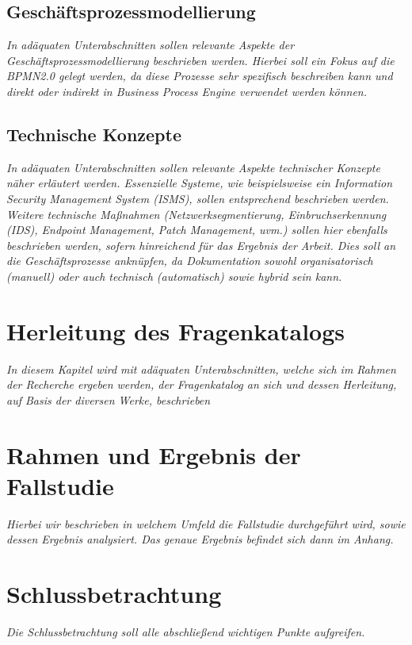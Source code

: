 \documentclass[11pt,a4paper,hidelinks]{article}   %
\begin{document}
        \subsection{Geschäftsprozessmodellierung}
            \emph{In adäquaten Unterabschnitten sollen relevante Aspekte der Geschäftsprozessmodellierung beschrieben werden. Hierbei soll ein Fokus auf die BPMN2.0 gelegt werden, da diese Prozesse sehr spezifisch beschreiben kann und direkt oder indirekt in Business Process Engine verwendet werden können.}
        \subsection{Technische Konzepte}
            \emph{In adäquaten Unterabschnitten sollen relevante Aspekte technischer Konzepte näher erläutert werden. Essenzielle Systeme, wie beispielsweise ein Information Security Management System (ISMS), sollen entsprechend beschrieben werden. Weitere technische Maßnahmen (Netzwerksegmentierung, Einbruchserkennung (IDS), Endpoint Management, Patch Management, uvm.) sollen hier ebenfalls beschrieben werden, sofern hinreichend für das Ergebnis der Arbeit. Dies soll an die Geschäftsprozesse anknüpfen, da Dokumentation sowohl organisatorisch (manuell) oder auch technisch (automatisch) sowie hybrid sein kann.}
    \section{Herleitung des Fragenkatalogs}\label{sec:HerleitungDesFragenkatalog}
        \emph{In diesem Kapitel wird mit adäquaten Unterabschnitten, welche sich im Rahmen der Recherche ergeben werden, der Fragenkatalog an sich und dessen Herleitung, auf Basis der diversen Werke, beschrieben}

    \newpage
    \section{Rahmen und Ergebnis der Fallstudie}
        \emph{Hierbei wir beschrieben in welchem Umfeld die Fallstudie durchgeführt wird, sowie dessen Ergebnis analysiert. Das genaue Ergebnis befindet sich dann im Anhang.}

    \newpage
    \section{Schlussbetrachtung}
        \emph{Die Schlussbetrachtung soll alle abschließend wichtigen Punkte aufgreifen.}
\end{document}
